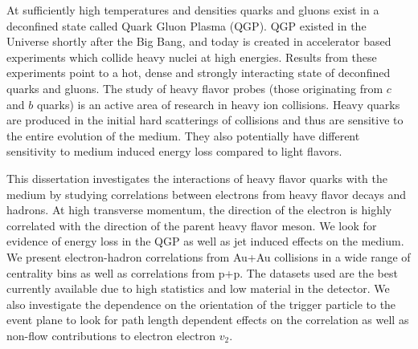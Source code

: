 At sufficiently high temperatures and densities quarks and gluons exist in a deconfined state called Quark Gluon Plasma (QGP). QGP existed in the Universe shortly after the Big Bang, and today is created in accelerator based experiments which collide heavy nuclei at high energies. Results from these experiments point to a hot, dense and strongly interacting state of deconfined quarks and gluons. The study of heavy flavor probes (those originating from $c$ and $b$ quarks) is an active area of research in heavy ion collisions. Heavy quarks are produced in the initial hard scatterings of collisions and thus are sensitive to the entire evolution of the medium. They also potentially have different sensitivity to medium induced energy loss compared to light flavors. 

This dissertation investigates the interactions of heavy flavor quarks with the medium by studying correlations between electrons from heavy flavor decays and hadrons. At high transverse momentum, the direction of the electron is highly correlated with the direction of the parent heavy flavor meson. We look for evidence of energy loss in the QGP as well as jet induced effects on the medium. We present electron-hadron correlations from Au+Au collisions in a wide range of centrality bins as well as correlations from p+p. The datasets used are the best currently available due to high statistics and low material in the detector. We also investigate the dependence on the orientation of the trigger particle to the event plane to look for path length dependent effects on the correlation as well as non-flow contributions to electron electron $v_2$.

